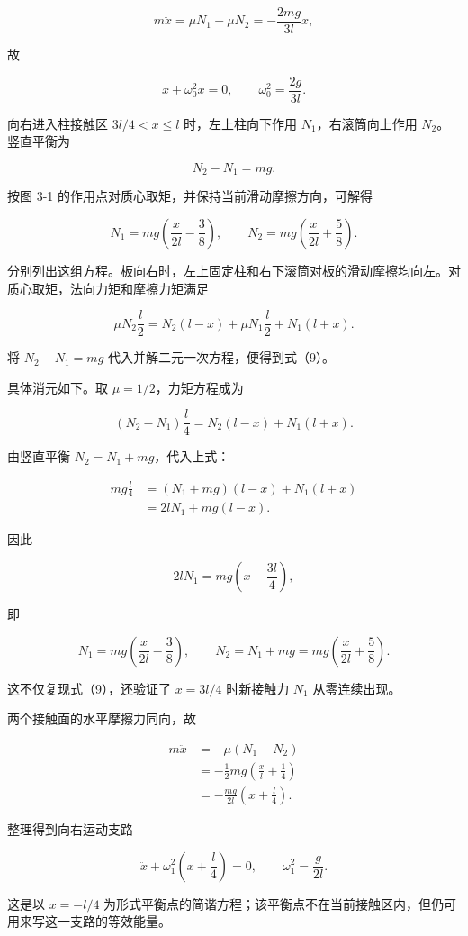 \documentclass[12pt,a4paper,UTF8]{ctexart}
\begin{document}
\[
m\ddot x=\mu N_1-\mu N_2
=-\frac{2mg}{3l}x,
\tag{6}
\]

故

\[
\ddot x+\omega_0^2x=0,
\qquad
\omega_0^2=\frac{2g}{3l}.
\tag{7}
\]

向右进入柱接触区 \(3l/4<x\le l\) 时，左上柱向下作用
\(N_1\)，右滚筒向上作用 \(N_2\)。竖直平衡为

\[
N_2-N_1=mg.
\tag{8}
\]

按图 3-1 的作用点对质心取矩，并保持当前滑动摩擦方向，可解得

\[
N_1=mg\left(\frac{x}{2l}-\frac38\right),
\qquad
N_2=mg\left(\frac{x}{2l}+\frac58\right).
\tag{9}
\]

分别列出这组方程。板向右时，左上固定柱和右下滚筒对板的滑动摩擦均向左。对质心取矩，法向力矩和摩擦力矩满足

\[
\mu N_2\frac l2
=N_2(l-x)+\mu N_1\frac l2+N_1(l+x).
\]

将 \(N_2-N_1=mg\) 代入并解二元一次方程，便得到式（9）。

具体消元如下。取 \(\mu=1/2\)，力矩方程成为

\[
(N_2-N_1)\frac l4
=N_2(l-x)+N_1(l+x).
\]

由竖直平衡 \(N_2=N_1+mg\)，代入上式：

\[
\begin{aligned}
mg\frac l4
&=(N_1+mg)(l-x)+N_1(l+x)\\
&=2lN_1+mg(l-x).
\end{aligned}
\]

因此

\[
2lN_1=mg\left(x-\frac{3l}{4}\right),
\]

即

\[
N_1=mg\left(\frac{x}{2l}-\frac38\right),
\qquad
N_2=N_1+mg
=mg\left(\frac{x}{2l}+\frac58\right).
\]

这不仅复现式（9），还验证了 \(x=3l/4\) 时新接触力 \(N_1\) 从零连续出现。

两个接触面的水平摩擦力同向，故

\[
\begin{aligned}
m\ddot x
&=-\mu(N_1+N_2)\\
&=-\frac12mg\left(\frac xl+\frac14\right)\\
&=-\frac{mg}{2l}\left(x+\frac l4\right).
\end{aligned}
\]

整理得到向右运动支路

\[
\ddot x+\omega_1^2\left(x+\frac l4\right)=0,
\qquad
\omega_1^2=\frac g{2l}.
\tag{10}
\]

这是以 \(x=-l/4\)
为形式平衡点的简谐方程；该平衡点不在当前接触区内，但仍可用来写这一支路的等效能量。
\end{document}

